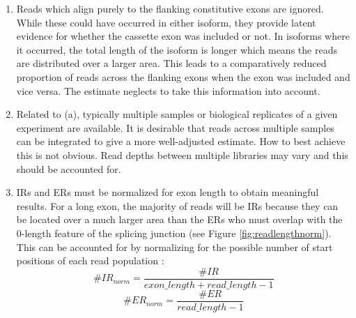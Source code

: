 \begin{enumerate}[label=(\alph*)]
	
	\item Reads which align purely to the flanking constitutive exons are ignored. While these could have occurred in either isoform, they provide latent evidence for whether the cassette exon was included or not. In isoforms where it occurred, the total length of the isoform is longer which means the reads are distributed over a larger area. This leads to a comparatively reduced proportion of reads across the flanking exons when the exon was included and vice versa. The estimate neglects to take this information into account.
	\item Related to (a), typically multiple samples or biological replicates of a given experiment are available. It is desirable that reads across multiple samples can be integrated to give a more well-adjusted estimate. How to best achieve this is not obvious. Read depths between multiple libraries may vary and this should be accounted for. 
	\item IRs and ERs must be normalized for exon length to obtain meaningful results. For a long exon, the majority of reads will be IRs because they can be located over a much larger area than the ERs who must overlap with the 0-length feature of the splicing junction (see Figure \ref{fig:readlengthnorm}). This can be accounted for by normalizing for the possible number of start positions of each read population \cite{berlinpsi}:
	$$\#IR_{norm} = \frac{\#IR}{exon\_length + read\_length -1}$$
	$$\#ER_{norm} = \frac{\#ER}{read\_length - 1}$$
	


\end{enumerate}
